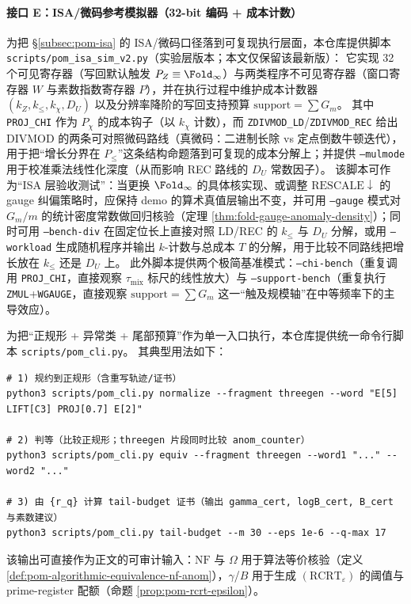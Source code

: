 \paragraph{接口 E：ISA/微码参考模拟器（32-bit 编码 + 成本计数）}
为把 \S\ref{subsec:pom-isa} 的 ISA/微码口径落到可复现执行层面，本仓库提供脚本
\texttt{scripts/pom\_isa\_sim\_v2.py}（实验层版本；本文仅保留该最新版）：
它实现 32 个可见寄存器（写回默认触发 \(P_Z\equiv\Fold_\infty\)）与两类程序不可见寄存器（窗口寄存器 \(W\) 与素数指数寄存器 \(P\)），并在执行过程中维护成本计数器
\((k_Z,k_{\le},k_\chi,D_U)\)
以及分辨率降阶的写回支持预算
\(\mathrm{support}=\sum G_m\)。
其中 \texttt{PROJ\_CHI} 作为 \(P_\chi\) 的成本钩子（以 \(k_\chi\) 计数），而 \texttt{ZDIVMOD\_LD}/\texttt{ZDIVMOD\_REC} 给出 DIVMOD 的两条可对照微码路线（真微码：二进制长除 vs 定点倒数牛顿迭代），用于把“增长分界在 \(P_{\le}\)”这条结构命题落到可复现的成本分解上；并提供 \texttt{--mulmode} 用于校准乘法线性化深度（从而影响 REC 路线的 \(D_U\) 常数因子）。
该脚本可作为“ISA 层验收测试”：当更换 \(\Fold_\infty\) 的具体核实现、或调整 \(\mathrm{RESCALE}\downarrow\) 的 gauge 纠偏策略时，应保持 demo 的算术真值层输出不变，并可用 \texttt{--gauge} 模式对 \(G_m/m\) 的统计密度常数做回归核验（定理 \ref{thm:fold-gauge-anomaly-density}）；同时可用 \texttt{--bench-div} 在固定位长上直接对照 LD/REC 的 \(k_{\le}\) 与 \(D_U\) 分解，或用 \texttt{--workload} 生成随机程序并输出 \(k\)-计数与总成本 \(T\) 的分解，用于比较不同路线把增长放在 \(k_{\le}\) 还是 \(D_U\) 上。
此外脚本提供两个极简基准模式：\texttt{--chi-bench}（重复调用 \texttt{PROJ\_CHI}，直接观察 \(\tau_{\mathrm{mix}}\) 标尺的线性放大）与 \texttt{--support-bench}（重复执行 \texttt{ZMUL}+\texttt{WGAUGE}，直接观察 \(\mathrm{support}=\sum G_m\) 这一“触及规模轴”在中等频率下的主导效应）。

\begin{remark}\label{rem:pom-cli-one-shot}
为把“正规形 + 异常类 + 尾部预算”作为单一入口执行，本仓库提供统一命令行脚本 \texttt{scripts/pom\_cli.py}。
其典型用法如下：
\begin{verbatim}
# 1) 规约到正规形（含重写轨迹/证书）
python3 scripts/pom_cli.py normalize --fragment threegen --word "E[5] LIFT[C3] PROJ[0.7] E[2]"

# 2) 判等（比较正规形；threegen 片段同时比较 anom_counter）
python3 scripts/pom_cli.py equiv --fragment threegen --word1 "..." --word2 "..."

# 3) 由 {r_q} 计算 tail-budget 证书（输出 gamma_cert, logB_cert, B_cert 与素数建议）
python3 scripts/pom_cli.py tail-budget --m 30 --eps 1e-6 --q-max 17
\end{verbatim}
该输出可直接作为正文的可审计输入：\(\mathrm{NF}\) 与 \(\Omega\) 用于算法等价核验（定义 \ref{def:pom-algorithmic-equivalence-nf-anom}），\(\gamma\)/\(B\) 用于生成 \((\mathrm{RCRT}_\varepsilon)\) 的阈值与 prime-register 配额（命题 \ref{prop:pom-rcrt-epsilon}）。
\end{remark}

